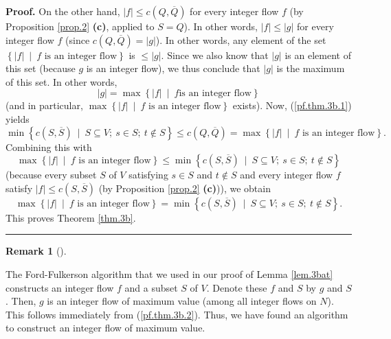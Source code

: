 \documentclass[numbers=enddot,12pt,final,onecolumn,notitlepage]{scrartcl}%
\theoremstyle{definition}
\newtheorem{remk}[theo]{Remark}
\newenvironment{remark}[1][]
{\begin{remk}[#1]\begin{leftbar}}
{\end{leftbar}\end{remk}}
\newenvironment{proof}[1][Proof]{\noindent\textbf{#1.} }{\ \rule{0.5em}{0.5em}}
\begin{document}
\begin{proof}
On the other hand, $\left\vert f\right\vert \leq c\left(  Q,\overline
{Q}\right)  $ for every integer flow $f$ (by Proposition \ref{prop.2}
\textbf{(c)}, applied to $S=Q$). In other words, $\left\vert f\right\vert
\leq\left\vert g\right\vert $ for every integer flow $f$ (since $c\left(
Q,\overline{Q}\right)  =\left\vert g\right\vert $). In other words, any
element of the set $\left\{  \left\vert f\right\vert \ \mid\ f\text{ is an
integer flow}\right\}  $ is $\leq\left\vert g\right\vert $. Since we also know
that $\left\vert g\right\vert $ is an element of this set (because $g$ is an
integer flow), we thus conclude that $\left\vert g\right\vert $ is the maximum
of this set. In other words,%
\begin{equation}
\left\vert g\right\vert =\max\left\{  \left\vert f\right\vert \ \mid\ f\text{
is an integer flow}\right\}  \label{pf.thm.3b.2}%
\end{equation}
(and in particular, $\max\left\{  \left\vert f\right\vert \ \mid\ f\text{ is
an integer flow}\right\}  $ exists). Now, (\ref{pf.thm.3b.1}) yields%
\[
\min\left\{  c\left(  S,\overline{S}\right)  \ \mid\ S\subseteq V;\ s\in
S;\ t\notin S\right\}  \leq c\left(  Q,\overline{Q}\right)  =\max\left\{
\left\vert f\right\vert \ \mid\ f\text{ is an integer flow}\right\}  .
\]
Combining this with%
\[
\max\left\{  \left\vert f\right\vert \ \mid\ f\text{ is an integer
flow}\right\}  \leq\min\left\{  c\left(  S,\overline{S}\right)  \ \mid
\ S\subseteq V;\ s\in S;\ t\notin S\right\}
\]
(because every subset $S$ of $V$ satisfying $s\in S$ and $t\notin S$ and every
integer flow $f$ satisfy $\left\vert f\right\vert \leq c\left(  S,\overline
{S}\right)  $ (by Proposition \ref{prop.2} \textbf{(c)})), we obtain%
\[
\max\left\{  \left\vert f\right\vert \ \mid\ f\text{ is an integer
flow}\right\}  =\min\left\{  c\left(  S,\overline{S}\right)  \ \mid
\ S\subseteq V;\ s\in S;\ t\notin S\right\}  .
\]
This proves Theorem \ref{thm.3b}.
\end{proof}

\begin{remark}
\label{rmk.3balg}The Ford-Fulkerson algorithm that we used in our proof of
Lemma \ref{lem.3bat} constructs an integer flow $f$ and a subset $S$ of $V$.
Denote these $f$ and $S$ by $g$ and $S$. Then, $g$ is an integer flow of
maximum value (among all integer flows on $N$). This follows immediately from
(\ref{pf.thm.3b.2}). Thus, we have found an algorithm to construct an integer
flow of maximum value.
\end{remark}
\end{document}
